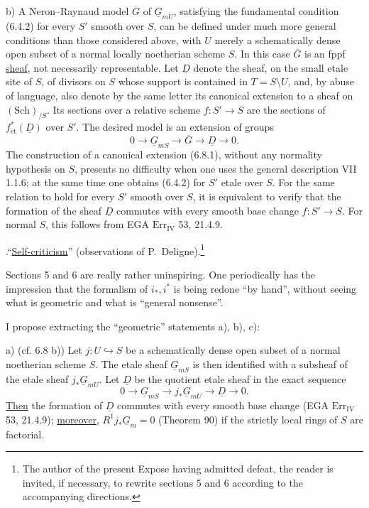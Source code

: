 \smallskip
\noindent b) A Neron--Raynaud model $\overline G$ of
$\underline G_{mU}$, satisfying the fundamental condition (6.4.2) for every
$S'$ smooth over $S$, can be defined under much more general conditions than
those considered above, with $U$ merely a schematically dense open subset
of a normal locally noetherian scheme $S$.  In this case $\overline G$ is an
fppf \underline{sheaf}, not necessarily representable.  Let $\underline D$
denote the sheaf, on the small etale site of $S$, of divisors on $S$ whose
support is contained in $T=S\setminus U$, and, by abuse of language, also
denote by the same letter its canonical extension to a sheaf on
$(\mathrm{Sch})_{/S}$.  Its sections over a relative scheme
$f:S'\to S$ are the sections of $f_{\mathrm{\acute{e}t}}^*(\underline D)$
over $S'$.  The desired model is an extension of groups
\begin{equation}\tag{6.8.1}
 0\longrightarrow\underline G_{mS}\longrightarrow\overline G
 \longrightarrow\underline D\longrightarrow0.
\end{equation}
The construction of a canonical extension (6.8.1), without any normality
hypothesis on $S$, presents no difficulty when one uses the general
description VII 1.1.6; at the same time one obtains (6.4.2) for $S'$ etale
over $S$.  For the same relation to hold for every $S'$ smooth over $S$, it
is equivalent to verify that the formation of the sheaf $\underline D$
commutes with every smooth base change $f:S'\to S$.  For normal $S$, this
follows from EGA $\mathrm{Err}_{\mathrm{IV}}$ 53, 21.4.9.

\medskip
{}.\quad ``\underline{Self-criticism}'' (observations of
P.~Deligne).\footnote{The author of the present Expose having admitted
defeat, the reader is invited, if necessary, to rewrite sections 5 and 6
according to the accompanying directions.}

Sections 5 and 6 are really rather uninspiring.  One periodically has the
impression that the formalism of $i_*,i^*$ is being redone ``by hand'',
without seeing what is geometric and what is ``general nonsense''.

I propose extracting the ``geometric'' statements a), b), c):

\smallskip
\noindent a) (cf. 6.8 b)) Let $j:U\hookrightarrow S$ be a schematically
dense open subset of a normal noetherian scheme $S$.  The etale sheaf
$\underline G_{mS}$ is then identified with a subsheaf of the etale sheaf
$j_*\underline G_{mU}$.  Let $\underline D$ be the quotient etale sheaf in
the exact sequence
\[
 0\longrightarrow\underline G_{mS}\longrightarrow
 j_*\underline G_{mU}\longrightarrow\underline D\longrightarrow0.
\]
\underline{Then} the formation of $\underline D$ commutes with every smooth
base change (EGA $\mathrm{Err}_{\mathrm{IV}}$ 53, 21.4.9); \underline{moreover},
$R^1j_*\underline G_m=0$ (Theorem 90) if the strictly local rings of $S$ are
factorial.


